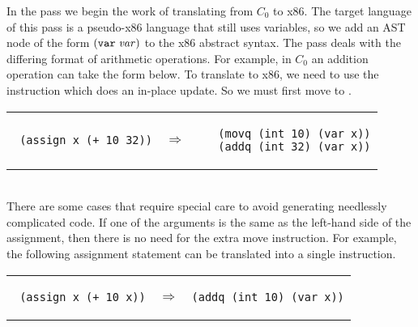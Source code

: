 \documentclass[11pt]{book}
\begin{document}
In the  pass we begin the work of translating
from $C_0$ to x86. The target language of this pass is a pseudo-x86
language that still uses variables, so we add an AST node of the form
$(\texttt{var}\;\mathit{var})$ to the x86 abstract syntax.  The
 pass deals with the differing format of
arithmetic operations. For example, in $C_0$ an addition operation can
take the form below.  To translate to x86, we need to use the
 instruction which does an in-place update. So we must first
move  to . \\
\begin{tabular}{lll}
\begin{minipage}{0.4\textwidth}
\begin{lstlisting}
 (assign x (+ 10 32))
\end{lstlisting}
\end{minipage}
&
$\Rightarrow$
&
\begin{minipage}{0.4\textwidth}
\begin{lstlisting}
   (movq (int 10) (var x))
   (addq (int 32) (var x))
\end{lstlisting}
\end{minipage}
\end{tabular} \\

There are some cases that require special care to avoid generating
needlessly complicated code. If one of the arguments is the same as
the left-hand side of the assignment, then there is no need for the
extra move instruction.  For example, the following assignment
statement can be translated into a single  instruction.\\
\begin{tabular}{lll}
\begin{minipage}{0.4\textwidth}
\begin{lstlisting}
 (assign x (+ 10 x))
\end{lstlisting}
\end{minipage}
&
$\Rightarrow$
&
\begin{minipage}{0.4\textwidth}
\begin{lstlisting}
(addq (int 10) (var x))
\end{lstlisting}
\end{minipage}
\end{tabular} \\
\end{document}
